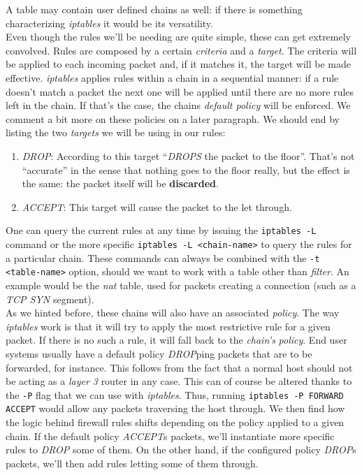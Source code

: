             A table may contain user defined chains as well: if there is something characterizing \textit{iptables} it would be its versatility.\\

            Even though the rules we'll be needing are quite simple, these can get extremely convolved. Rules are composed by a certain \textit{criteria} and a \textit{target}. The criteria will be applied to each incoming packet and, if it matches it, the target will be made effective. \textit{iptables} applies rules within a chain in a sequential manner: if a rule doesn't match a packet the next one will be applied until there are no more rules left in the chain. If that's the case, the chains \textit{default policy} will be enforced. We comment a bit more on these policies on a later paragraph. We should end by listing the two \textit{targets} we will be using in our rules:\\

            \begin{enumerate}
                \item \textit{DROP}: According to \cite{bib:man-iptables} this target ``\textit{DROPS} the packet to the floor''. That's not ``accurate'' in the sense that nothing goes to the floor really, but the effect is the same: the packet itself will be \textbf{discarded}.
                \item \textit{ACCEPT}: This target will cause the packet to the let through.
            \end{enumerate}

            One can query the current rules at any time by issuing the \texttt{iptables -L} command or the more specific \texttt{iptables -L <chain-name>} to query the rules for a particular chain. These commands can always be combined with the \texttt{-t <table-name>} option, should we want to work with a table other than \textit{filter}. An example would be the \textit{nat} table, used for packets creating a connection (such as a \textit{TCP SYN} segment).\\

            As we hinted before, these chains will also have an associated \textit{policy}. The way \textit{iptables} work is that it will try to apply the most restrictive rule for a given packet. If there is no such a rule, it will fall back to the \textit{chain's} \textit{policy}. End user systems usually have a default policy \textit{DROP}ping packets that are to be forwarded, for instance. This follows from the fact that a normal host should not be acting as a \textit{layer 3} router in any case. This can of course be altered thanks to the \texttt{-P} flag that we can use with \textit{iptables}. Thus, running \texttt{iptables -P FORWARD ACCEPT} would allow any packets traversing the host through. We then find how the logic behind firewall rules shifts depending on the policy applied to a given chain. If the default policy \textit{ACCEPT}s packets, we'll instantiate more specific rules to \textit{DROP} some of them. On the other hand, if the configured policy \textit{DROP}s packets, we'll then add rules letting some of them through.\\

